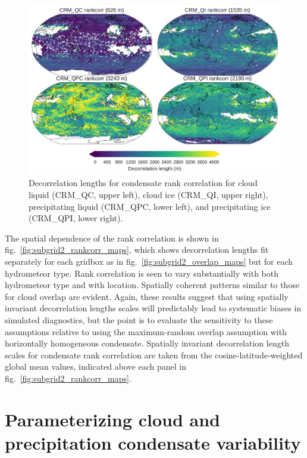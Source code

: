 \begin{figure}[htbp]
\centering
\includegraphics{graphics/subgrid2_rankcorr_maps.pdf}
\caption{\label{fig:subgrid2_rankcorr_maps}Decorrelation lengths for
condensate rank correlation for cloud liquid (CRM\_QC, upper left),
cloud ice (CRM\_QI, upper right), precipitating liquid (CRM\_QPC, lower
left), and precipitating ice (CRM\_QPI, lower
right).}\label{fig:subgrid2ux5frankcorrux5fmaps}
\end{figure}

The spatial dependence of the rank correlation is shown in
fig.~\ref{fig:subgrid2_rankcorr_maps}, which shows decorrelation lengths
fit separately for each gridbox as in
fig.~\ref{fig:subgrid2_overlap_maps} but for each hydrometeor type. Rank
correlation is seen to vary substantially with both hydrometeor type and
with location. Spatially coherent patterns similar to those for cloud
overlap are evident. Again, these results suggest that using spatially
invariant decorrelation lengths scales will predictably lead to
systematic biases in simulated diagnostics, but the point is to evaluate
the sensitivity to these assumptions relative to using the
maximum-random overlap assumption with horizontally homogeneous
condensate. Spatially invariant decorrelation length scales for
condensate rank correlation are taken from the cosine-latitude-weighted
global mean values, indicated above each panel in
fig.~\ref{fig:subgrid2_rankcorr_maps}.

\section{Parameterizing cloud and precipitation condensate
variability}\label{sec:subgrid2ux5fvariability}


